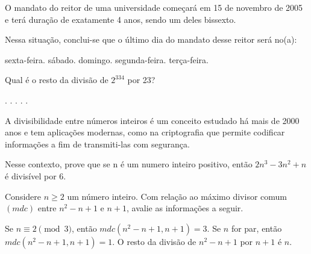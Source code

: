 \documentclass[a4paper, 12pt]{exam}
\begin{document}




    \begin{questions}
        \question
            O mandato do reitor de uma universidade começará em 15 de novembro de 2005 e terá duração de exatamente 4 anos, sendo um deles bissexto. 

            Nessa situação, conclui-se que o último dia do mandato desse reitor será no(a): 

                \begin{choices}
                    \choice sexta-feira.
                    \choice sábado.
                    \choice domingo.
                    \choice segunda-feira.
                    \choice terça-feira.
                \end{choices}

        \question
            Qual é o resto da divisão de $2^{334}$ por 23?
            
                \begin{choices}
                .
                .
                .
                .
                .
                \end{choices}
        \question
            A divisibilidade entre números inteiros é um conceito estudado há mais de 2000 anos e tem aplicações modernas, como na criptografia que permite codificar informações a fim de transmiti-las com segurança.


            Nesse contexto, prove que se n é um numero inteiro positivo, então $2n^3 - 3n^2 +n $ é divisível por 6.

        \question
            Considere $n\geqslant2$ um número inteiro. Com relação ao máximo divisor comum $(mdc)$ entre $n^2-n +1$ e $n+1$, avalie as informações a seguir.
            
        \begin{subparts}
            \subpart Se $n \equiv 2\pmod{3}$, então $mdc(n^2-n+1, n+1)=3$.
            \subpart Se $n$ for par, então $mdc(n^2-n+1, n+1)=1$.
            \subpart O resto da divisão de $n^2-n+1$ por $n+1$ é $n$.
        \end{subparts}
        

\end{questions}
\end{document}

